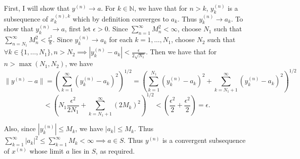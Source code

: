 \documentclass[letterpaper, reqno,11pt]{article}
\begin{document}
First, I will show that $y^{(n)}\to a$. For $k\in \mathbb{N}$, we have that for $n>k$, $y^{(n)}_k$ is a subsequence of $x^{(n),k}_k$ which by definition converges to $a_k$. Thus $y^{(n)}_k\to a_k$. To show that $y^{(n)}_k\to a$, first let $\epsilon>0$. Since $\sum_{n=1}^{\infty}M_n^2<\infty$, choose $N_1$ such that $\sum_{n=N_1}^{\infty}M_n^2<\frac{\epsilon^2}{8}$. Since $y^{(n)}_k\to a_k$ for each $k=1,\ldots,N_1$, choose $N_2$ such that $\forall k\in \{1,\ldots, N_1\},n>N_2\implies |y^{(n)}_k-a_k|<\frac{\epsilon}{2\sqrt{N_1}}$. Then we have that for $n>\max(N_1,N_2)$, we have
\[
\| y^{(n)}-a \|=\left( \sum_{k=1}^{\infty}(y^{(n)}_k-a_k)^2 \right)^{1 /2} =\left( \sum_{k=1}^{N_1}(y^{(n)}_k-a_k)^2+\sum_{k=N_1+1}^{\infty}(y^{(n)}_k-a_k)^2 \right)^{1 /2}
\]
\[
< \left( N_1 \frac{\epsilon^2}{2N_1}+\sum_{k=N_1+1}^{\infty}(2M_k)^2 \right) ^{1 /2}<\left( \frac{\epsilon^2}{2}+\frac{\epsilon^2}{2} \right) =\epsilon
.\]

Also, since $\left|y^{(n)}_k\right|\leq M_k$, we have $|a_k|\leq M_k$. Thus $\sum_{k=1}^{\infty}|a_k|^2\leq \sum_{k=1}^{\infty}M_k<\infty \implies a\in S$. Thus $y^{(n)}$ is a convergent subsequence of $x^{(n)}$ whose limit $a$ lies in $S$, as required.

\newpage\phantom{blabla}
\newpage
\end{document}
